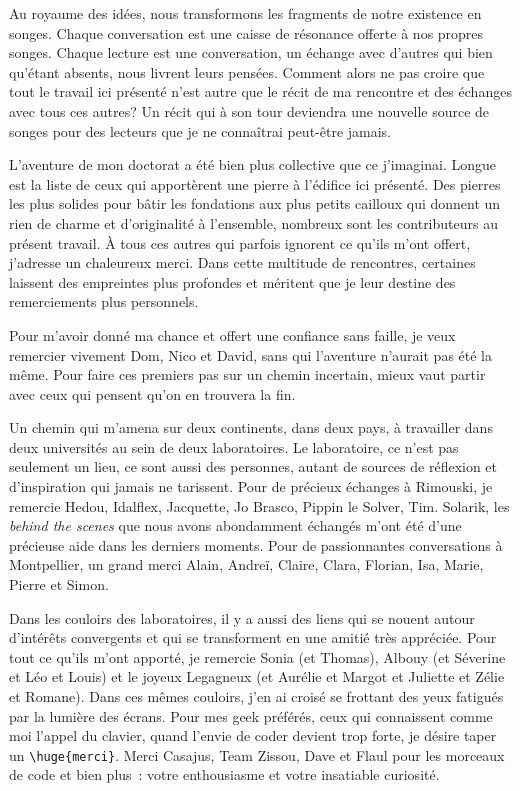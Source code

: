 Au royaume des idées, nous transformons les fragments de notre existence
en songes. Chaque conversation est une caisse de résonance offerte à nos
propres songes. Chaque lecture est une conversation, un échange avec
d'autres qui bien qu'étant absents, nous livrent leurs pensées. Comment
alors ne pas croire que tout le travail ici présenté n'est autre que le
récit de ma rencontre et des échanges avec tous ces autres? Un récit qui
à son tour deviendra une nouvelle source de songes pour des lecteurs que
je ne connaîtrai peut-être jamais.

L'aventure de mon doctorat a été bien plus collective que ce j'imaginai.
Longue est la liste de ceux qui apportèrent une pierre à l'édifice ici
présenté. Des pierres les plus solides pour bâtir les fondations aux
plus petits cailloux qui donnent un rien de charme et d'originalité à
l'ensemble, nombreux sont les contributeurs au présent travail. À tous
ces autres qui parfois ignorent ce qu'ils m'ont offert, j'adresse un
chaleureux merci. Dans cette multitude de rencontres, certaines laissent
des empreintes plus profondes et méritent que je leur destine des
remerciements plus personnels.

Pour m'avoir donné ma chance et offert une confiance sans faille, je
veux remercier vivement Dom, Nico et David, sans qui l'aventure n'aurait
pas été la même. Pour faire ces premiers pas sur un chemin incertain,
mieux vaut partir avec ceux qui pensent qu'on en trouvera la fin.

Un chemin qui m'amena sur deux continents, dans deux pays, à travailler
dans deux universités au sein de deux laboratoires. Le laboratoire, ce
n'est pas seulement un lieu, ce sont aussi des personnes, autant de
sources de réflexion et d'inspiration qui jamais ne tarissent. Pour de
précieux échanges à Rimouski, je remercie Hedou, Idalflex, Jacquette, Jo
Brasco, Pippin le Solver, Tim. Solarik, les \emph{behind the scenes} que
nous avons abondamment échangés m'ont été d'une précieuse aide dans les
derniers moments. Pour de passionnantes conversations à Montpellier, un
grand merci Alain, Andreï, Claire, Clara, Florian, Isa, Marie, Pierre et
Simon.

Dans les couloirs des laboratoires, il y a aussi des liens qui se nouent
autour d'intérêts convergents et qui se transforment en une amitié très
appréciée. Pour tout ce qu'ils m'ont apporté, je remercie Sonia (et
Thomas), Albouy (et Séverine et Léo et Louis) et le joyeux Legagneux (et
Aurélie et Margot et Juliette et Zélie et Romane). Dans ces mêmes
couloirs, j'en ai croisé se frottant des yeux fatigués par la lumière
des écrans. Pour mes geek préférés, ceux qui connaissent comme moi
l'appel du clavier, quand l'envie de coder devient trop forte, je désire
taper un \texttt{\textbackslash{}huge\{merci\}}. Merci Casajus, Team
Zissou, Dave et Flaul pour les morceaux de code et bien plus~: votre
enthousiasme et votre insatiable curiosité.

